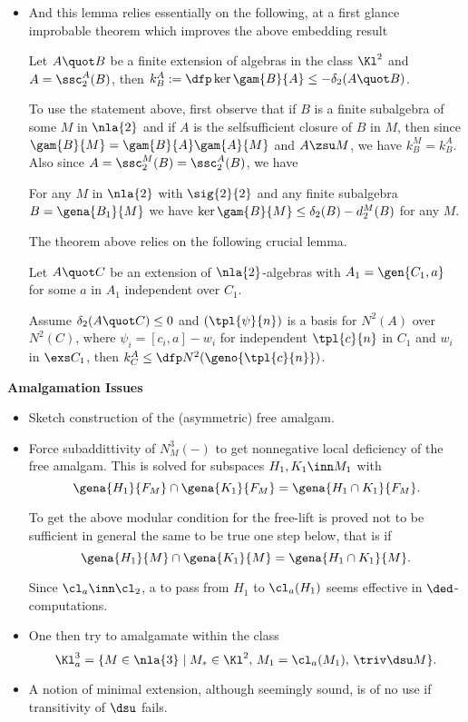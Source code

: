 \documentclass[a4paper,11pt,german,english]{report}
\begin{document}
\begin{itemize}

\item[]And this lemma relies essentially on the following,
at a first glance improbable theorem which improves the above
embedding result
\begin{teo*}
Let $A\quot B$ be a finite extension of algebras in the class $\Kl^{2}$ and
$A=\ssc_{2}^{A}(B)$, then $k_{B}^{A}:=\dfp\ker\gam{B}{A}\leq-\delta_{2}(A\quot B)$.
\end{teo*}
To use the statement above, first observe
that if $B$ is a finite subalgebra of some $M$ in $\nla{2}$ and if $A$ is the selfsufficient closure  
of $B$ in $M$, then since $\gam{B}{M}
=\gam{B}{A}\gam{A}{M}$ and $A\zsu M$, we have $k_{B}^{M}=k_{B}^{A}$.
Also since $A=\ssc_{2}^{M}(B)=\ssc_{2}^{A}(B)$, we have
\begin{cor*}
For any $M$ in $\nla{2}$ with $\sig{2}{2}$ and any finite subalgebra $B=\gena{B_{1}}{M}$
we have $\ker\gam{B}{M}\leq\delta_{2}(B)-d_{2}^{M}(B)$ for any $M$.
\end{cor*}

The theorem above relies on the following crucial lemma.
\begin{lem*}
Let $A\quot C$ be an extension of $\nla{2}$-algebras with %
$A_{1}=\gen{C_{1},a}$ for some $a$ in $A_{1}$ independent over $C_{1}$.

Assume $\delta_{2}(A\quot C)\leq0$ and $\left(\tpl{\psi}{n}\right)$ is a basis
for $N^{2}(A)$ over $N^{2}(C)$, where $\psi_{i}=[c_{i},a]-w_{i}$ for independent $\tpl{c}{n}$ in
$C_{1}$ and $w_{i}$ in $\exs C_{1}$, then $k_{C}^{A}\leq\dfp N^{2}(\geno{\tpl{c}{n}})$.
\end{lem*}
\end{itemize}
\indent
{\bf Amalgamation Issues}
\begin{itemize}
\item[]Sketch construction of the (asymmetric) free amalgam.
\item[]Force subaddittivity of $N^{3}_{M}(-)$ to get nonnegative local deficiency
of the free amalgam. This is solved for subspaces $H_{1},K_{1}\inn M_{1}$ with
$$\gena{H_{1}}{F_{M}}\cap\gena{K_{1}}{F_{M}}=\gena{H_{1}\cap K_{1}}{F_{M}}.$$

To get the above modular condition for the free-lift is proved not to be sufficient in general the same
to be true one step below, that is if
$$\gena{H_{1}}{{M}}\cap\gena{K_{1}}{{M}}=\gena{H_{1}\cap K_{1}}{{M}}.$$

Since $\cl_{a}\inn\cl_{2}$, a to pass from $H_{1}$ to $\cl_{a}(H_{1})$ seems
effective in $\ded$-computations.

\item[]One then try to amalgamate within the class
$$\Kl^{3}_{a}=\{M\in\nla{3}\mid M_{*}\in\Kl^{2},\,M_{1}=\cl_{a}(M_{1}),\,\triv\dsu M\}.$$

\item[]A notion of minimal extension, although seemingly sound, is of no use
if transitivity of $\dsu$ fails.
\end{itemize}
\end{document}
